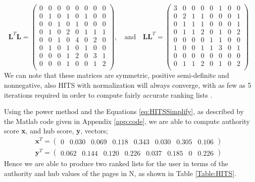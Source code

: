 \documentclass[11pt]{report}
\begin{document}
\begin{equation*}
\textbf{L}^T\textbf{L}=\left(
\begin{array}{cccccccc}
0 & 0 & 0 & 0 & 0 & 0 & 0 & 0 \\
0 & 1 & 0 & 1 & 0 & 1 & 0 & 0 \\
0 & 0 & 1 & 0 & 1 & 0 & 0 & 0 \\
0 & 1 & 0 & 2 & 0 & 1 & 1 & 1 \\
0 & 0 & 1 & 0 & 4 & 0 & 2 & 0 \\
0 & 1 & 0 & 1 & 0 & 1 & 0 & 0 \\
0 & 0 & 0 & 1 & 2 & 0 & 3 & 1 \\
0 & 0 & 0 & 1 & 0 & 0 & 1 & 2 \\
\end{array}
\right)
\mathrm{,}\quad\mathrm{and}\quad
\textbf{LL}^T=\left(
\begin{array}{cccccccc}
3 & 0 & 0 & 0 & 0 & 1 & 0 & 0 \\
0 & 2 & 1 & 1 & 0 & 0 & 0 & 1 \\
0 & 1 & 1 & 1 & 0 & 0 & 0 & 1 \\
0 & 1 & 1 & 2 & 0 & 1 & 0 & 2 \\
0 & 0 & 0 & 0 & 1 & 1 & 0 & 0 \\
1 & 0 & 0 & 1 & 1 & 3 & 0 & 1 \\
0 & 0 & 0 & 0 & 0 & 0 & 0 & 0 \\
0 & 1 & 1 & 2 & 0 & 1 & 0 & 2 \\
\end{array}
\right)
\end{equation*} We can note that these matrices are symmetric, positive semi-definite and nonnegative, also HITS with normalization will always converge, with as few as 5 iterations required in order to compute fairly accurate ranking lists \cite{manning}. 

Using the power method and the Equations \eqref{eq:HITSSimplify}, as described by the Matlab code given in Appendix \ref{app:code}, we are able to compute authority score \textbf{x}, and hub score, \textbf{y}, vectors;
\begin{eqnarray}
\textbf{x}^T = \left( \begin{array} {cccccccc}
0 & 0.030 & 0.069 & 0.118 & 0.343 &0.030 &0.305 &0.106
\end{array}\right) \\
\textbf{y}^T = \left( \begin{array} {cccccccc}
0.062 & 0.144 & 0.120 & 0.226 & 0.037 & 0.185 & 0 & 0.226
\end{array}\right)
\end{eqnarray} Hence we are able to produce two ranked lists for the user in terms of the authority and hub values of the pages in N, as shown in Table \ref{Table:HITS}.
\end{document}
